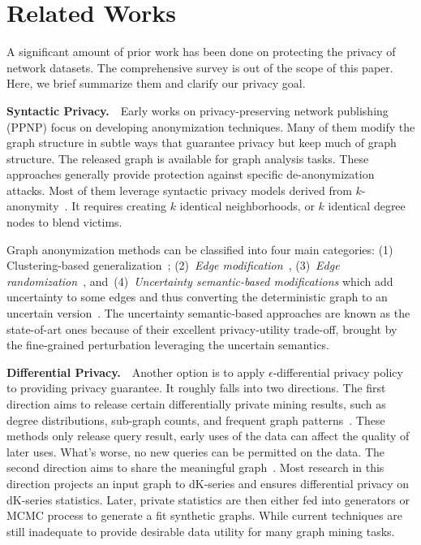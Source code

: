 \section{Related Works}
A significant amount of prior work has been done on protecting the privacy of network datasets.
The comprehensive survey is out of the scope of this paper. Here, we brief summarize them and clarify our privacy goal. 

\textbf{Syntactic Privacy.}~~Early works on privacy-preserving network publishing (PPNP) focus on developing anonymization techniques. Many of them modify the graph structure in subtle ways that guarantee privacy but keep much of graph structure. The released graph is available for  graph analysis tasks. These approaches generally provide protection against specific de-anonymization attacks. Most of them leverage syntactic privacy models derived from $k$-anonymity~\cite{Sweeney:2002:KAM:774544.774552}. It requires creating $k$ identical neighborhoods, or $k$ identical degree nodes to blend victims. 

Graph anonymization methods can be classified into four main categories: (1) Clustering-based generalization~\cite{Hay_Anonymizing_2007,Bhagat_Class_2009,hay2010resisting}; (2)~{\em Edge modification}~\cite{Liu_Towards_2008, Zhou_Preserving_2008, Wang2011, Wu_k_2010, Skarkala_Privacy_2012}, 
(3)~{\em Edge randomization}~\cite{Liu_Privacy_2009,Ying_Randomizing_2008, Ninggal_Utility_2015},
and~(4)~{\em Uncertainty semantic-based modifications} which add uncertainty to some edges and thus converting the deterministic graph to an uncertain version~\cite{Boldi_Injecting_2012, Nguyen_Anonymizing_2015}. The uncertainty semantic-based approaches are known as the state-of-art ones because of their excellent privacy-utility trade-off, brought by the fine-grained perturbation leveraging the uncertain semantics. 

 
\textbf{Differential Privacy.}~~Another option is to apply {$\epsilon$}-differential privacy policy to providing privacy guarantee. It roughly falls into two directions. The first direction aims to release certain differentially private mining results, such as degree distributions, sub-graph counts, and frequent graph patterns~\cite{Xiao_Differentially_2014,Day:2016}. These methods only release query result, early uses of the data can affect the quality of later uses. What's worse, no new queries can be permitted on the data. The second direction aims to share the meaningful graph~\cite{Sala_Sharing_2011}. Most research in this direction projects an input graph to dK-series and ensures differential privacy on dK-series statistics. Later, private statistics are then either fed into generators or MCMC process to generate a fit synthetic graphs. While current techniques are still inadequate to provide desirable data utility for many graph mining tasks. 

